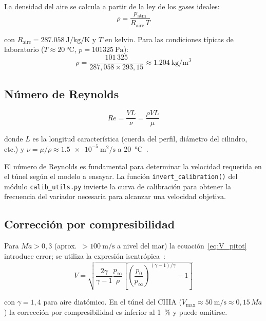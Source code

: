 \documentclass[12pt,a4paper]{article}
\begin{document}
La densidad del aire se calcula a partir de la ley de los gases ideales:
\begin{equation}
	\rho = \frac{p_\mathrm{atm}}{R_\mathrm{aire}\,T}
	\label{eq:rho_ideal}
\end{equation}

con $R_\mathrm{aire} = \SI{287.058}{\joule\per\kilogram\per\kelvin}$
y $T$ en kelvin.  Para las condiciones típicas de laboratorio
($T \approx \SI{20}{\degreeCelsius}$, $p = \SI{101325}{\pascal}$):
\begin{equation}
	\rho = \frac{101\,325}{287{,}058 \times 293{,}15}
	\approx \SI{1.204}{\kilogram\per\metre\cubed}
	\label{eq:rho_ejemplo}
\end{equation}

\subsection{Número de Reynolds}

\begin{equation}
	Re = \frac{V L}{\nu} = \frac{\rho V L}{\mu}
	\label{eq:Reynolds}
\end{equation}

donde $L$ es la longitud característica (cuerda del perfil, diámetro del
cilindro, etc.) y $\nu = \mu/\rho \approx \SI{1.5e-5}{\metre\squared\per\second}$
a \SI{20}{\degreeCelsius}~\cite{anderson2017}.

El número de Reynolds es fundamental para determinar la velocidad requerida
en el túnel según el modelo a ensayar. La función
\texttt{invert\_calibration()} del módulo \texttt{calib\_utils.py} invierte la
curva de calibración para obtener la frecuencia del variador necesaria para
alcanzar una velocidad objetiva.

\subsection{Corrección por compresibilidad}

Para $Ma > 0{,}3$ (aprox.\ $>\SI{100}{\metre\per\second}$ a nivel del mar) la
ecuación~\eqref{eq:V_pitot} introduce error; se utiliza la expresión
isentrópica~\cite{anderson2017}:
\begin{equation}
	V = \sqrt{\frac{2\gamma}{\gamma-1}\frac{p_\infty}{\rho}
		\left[\left(\frac{p_0}{p_\infty}\right)^{(\gamma-1)/\gamma} - 1\right]}
	\label{eq:V_compresible}
\end{equation}

con $\gamma = 1{,}4$ para aire diatómico.  En el túnel del CIIIA
($V_\mathrm{max} \approx \SI{50}{\metre\per\second} \approx 0{,}15\,Ma$) la
corrección por compresibilidad es inferior al \SI{1}{\percent} y puede
omitirse.
\end{document}
